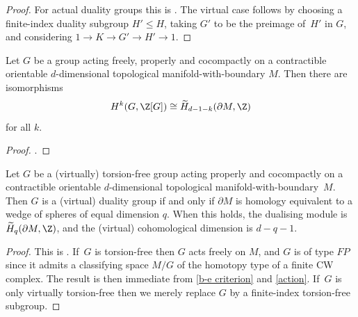 \Changelback

\begin{proof}For actual duality groups this is \cite[Th.\,3.5]{be}. The virtual case follows by choosing a finite-index duality subgroup $H' \leq H$, taking $G'$ to be the preimage of~$H'$ in $G$, and considering $1 \to K \to G' \to H' \to 1$.
\end{proof}

\begin{prop}\label{action}
Let $G$ be a group acting freely, properly and cocompactly on a contractible orientable $d$-dimensional topological manifold-with-boundary $M$. Then there are isomorphisms
\[
H^k(G,\Z[G]) \cong \widetilde H_{d-1-k}(\partial M,\Z)
\]
for all $k$.
\end{prop}

\begin{proof}
\cite[\S 6.4]{be}.
\end{proof}

\begin{cor}\label{criterion}
Let $G$ be a (virtually) torsion-free group acting properly and cocompactly on a contractible orientable $d$-dimensional topological manifold-with-boundary~$M$. Then $G$ is a (virtual) duality group if and only if $\partial M$ is homology equivalent to a wedge of spheres of equal dimension $q$. When this holds, the dualising module is $\widetilde H_q(\partial M,\Z)$, and the (virtual) cohomological dimension is $d-q-1$.
\end{cor}

\begin{proof}This is \cite[Th.\,6.2]{be}. If~$G$ is torsion-free then $G$ acts freely on $M$, and $G$ is of type $\mathit{FP}$ since it admits a classifying space $M/G$ of the homotopy type of a finite CW complex. The result is then immediate from \cref{b-e criterion} and \cref{action}. If~$G$ is only virtually torsion-free then we merely replace $G$ by a finite-index torsion-free subgroup.
\end{proof}

